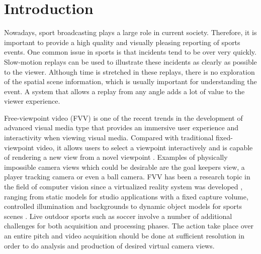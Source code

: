 \section{Introduction}
Nowadays, sport broadcasting plays a large role in current society.
Therefore, it is important to provide a high quality and visually pleasing reporting of sports events.
One common issue in sports is that incidents tend to be over very quickly.
Slow-motion replays can be used to illustrate these incidents as clearly as possible to the viewer. 
Although time is stretched in these replays, there is no exploration of the spatial scene information, which is usually 
important for understanding the event.
A system that allows a replay from any angle adds a lot of value to the viewer experience.



Free-viewpoint video (FVV) is one of the recent trends in the development of advanced visual media type
that provides an immersive user experience and interactivity when viewing
visual media. Compared with traditional fixed-viewpoint
video, it allows users to select a viewpoint interactively and
is capable of rendering a new view from a novel viewpoint \cite{05_plane_sweeping}.
Examples of physically impossible camera views which
could be desirable are the goal keepers view, a player tracking camera or even a
ball camera.
FVV has been a research topic in the field of computer vision 
since a virtualized reality system was developed \cite{b4},
ranging from static models for studio applications with a fixed
capture volume, controlled illumination and backgrounds \cite{b5} 
to dynamic object models for sports scenes \cite{b6,b7,b8}.
Live outdoor sports such as soccer involve a number of additional challenges for both acquisition and processing phases. 
The action take place over an entire pitch and video acquisition should be done at sufficient resolution in order to
do analysis and production of desired virtual camera views.

